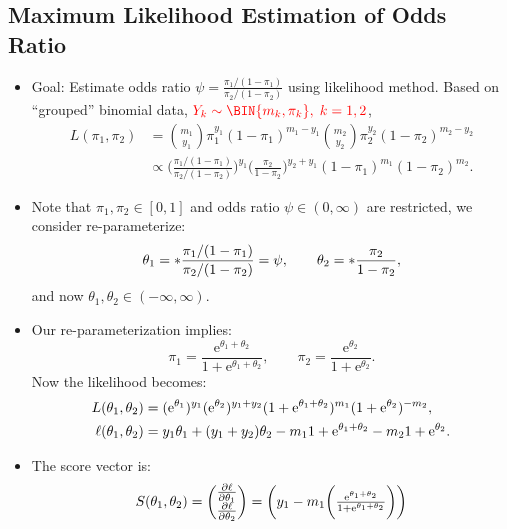 \documentclass{article}\usepackage[]{graphicx}\usepackage[svgnames]{xcolor}
\let\log\relax%
\begin{document}
\subsection*{Maximum Likelihood Estimation of Odds Ratio}
\begin{itemize}
    \item Goal: Estimate odds ratio $ \psi=\frac{\pi_1/(1-\pi_1)}{\pi_2/(1-\pi_2)} $ using likelihood method. Based
          on ``grouped'' binomial data, $ \textcolor{Red}{Y_k \sim \BIN{m_k,\pi_k},\; k=1,2} $,
          \begin{align*}
              L(\pi_1,\pi_2)
               & =\binom{m_1}{y_1}\pi_1^{y_1}(1-\pi_1)^{m_1-y_1}\binom{m_2}{y_2}\pi_2^{y_2}(1-\pi_2)^{m_2-y_2}                                                        \\
               & \propto\biggl(\frac{\pi_1/(1-\pi_1)}{\pi_2/(1-\pi_2)} \biggr)^{\!y_1}\biggl(\frac{\pi_2}{1-\pi_2}\biggr)^{\! y_2+y_1}(1-\pi_1)^{m_1}(1-\pi_2)^{m_2}.
          \end{align*}
    \item Note that $ \pi_1,\pi_2\in[0,1] $ and odds ratio $ \psi\in(0,\infty) $ are restricted, we consider re-parameterize:
          \[ \theta_1=\log*{\frac{\pi_1/(1-\pi_1)}{\pi_2/(1-\pi_2)}}=\log{\psi},\qquad \theta_2=\log*{\frac{\pi_2}{1-\pi_2}}, \]
          and now $ \theta_1,\theta_2\in(-\infty,\infty) $.
    \item Our re-parameterization implies:
          \[ \pi_1=\frac{\mathrm{e}^{\theta_1+\theta_2}}{1+\mathrm{e}^{\theta_1+\theta_2}},\qquad \pi_2=\frac{\mathrm{e}^{\theta_2}}{1+\mathrm{e}^{\theta_2}}. \]
          Now the likelihood becomes:
          \begin{align*}
              L(\theta_1,\theta_2)    & =(\mathrm{e}^{\theta_1})^{y_1}(\mathrm{e}^{\theta_2})^{y_1+y_2}(1+\mathrm{e}^{\theta_1+\theta_2})^{m_1}(1+\mathrm{e}^{\theta_2})^{-m_2}, \\
              \ell(\theta_1,\theta_2) & =y_1\theta_1+(y_1+y_2)\theta_2-m_1\log{1+\mathrm{e}^{\theta_1+\theta_2}}-m_2\log{1+\mathrm{e}^{\theta_2}}.
          \end{align*}
    \item The score vector is:
          \[ S(\theta_1,\theta_2)=\begin{pmatrix}
                  \pdv{\ell}{\theta_1} \\
                  \pdv{\ell}{\theta_2}
              \end{pmatrix}=\begin{pmatrix}
                  y_1-m_1\biggl(\frac{\mathrm{e}^{\theta_1+\theta_2}}{1+\mathrm{e}^{\theta_1+\theta_2}} \biggr) \\

\end{pmatrix}\]
\end{itemize}
\end{document}
